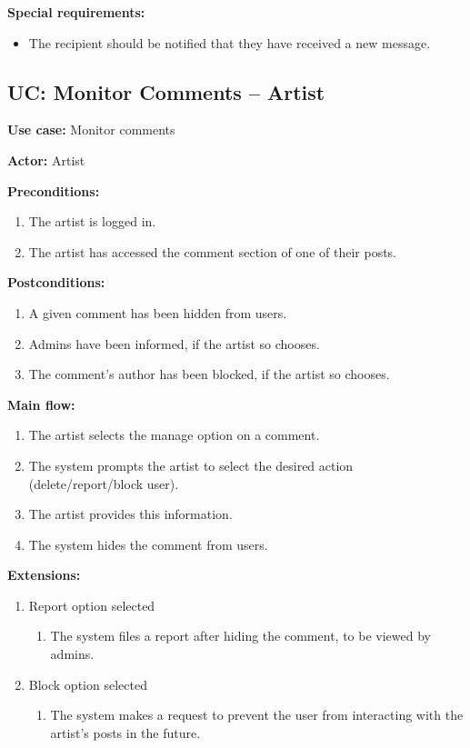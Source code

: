 \documentclass[11pt]{report}
\begin{document}
{\bfseries Special requirements:}
\begin{itemize}
	\item The recipient should be notified that they have received a new message.
\end{itemize}


\subsection{UC: Monitor Comments -- Artist}

{\bfseries Use case:} Monitor comments

{\bfseries Actor:} Artist

{\bfseries Preconditions:}
\begin{enumerate}
	\item The artist is logged in.
	\item The artist has accessed the comment section of one of their posts.
\end{enumerate}

{\bfseries Postconditions:}
\begin{enumerate}
	\item A given comment has been hidden from users.
	\item Admins have been informed, if the artist so chooses.
	\item The comment's author has been blocked, if the artist so chooses.
\end{enumerate}

{\bfseries Main flow:}
\begin{enumerate}
	\item The artist selects the manage option on a comment.
	\item The system prompts the artist to select the desired action (delete/report/block user).
	\item The artist provides this information.
	\item The system hides the comment from users.
\end{enumerate}

{\bfseries Extensions:}
\begin{enumerate}
	\item [4a.] Report option selected
	\begin{enumerate}
		\item [4a1.] The system files a report after hiding the comment, to be viewed by admins.
	\end{enumerate}
	\item[4b.] Block option selected
	\begin{enumerate}
		\item [4b1.] The system makes a request to prevent the user from interacting with the artist's posts in the future.
	\end{enumerate}
\end{enumerate}
\end{document}
